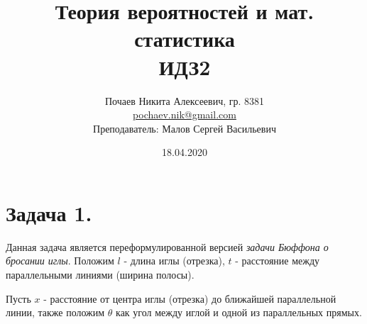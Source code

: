 

\title{Теория вероятностей и мат. статистика \\ ИДЗ2}
\date{18.04.2020}
\author{Почаев Никита Алексеевич, гр. 8381 \\ \href{mailto:pochaev.nik@gmail.com}{pochaev.nik@gmail.com} \\ Преподаватель: Малов Сергей Васильевич}


	
\renewcommand{\figurename}{Рисунок}

\maketitle

\begin{figure}[H]
\end{figure}

\section*{Задача 1.}

Данная задача является переформулированной версией \textit{задачи Бюффона о бросании иглы}. Положим $l$ - длина иглы (отрезка), $t$ - расстояние между параллельными линиями (ширина полосы).

Пусть $x$ - расстояние от центра иглы (отрезка) до ближайшей параллельной линии, также положим $\theta$ как угол между иглой и одной из параллельных прямых.


